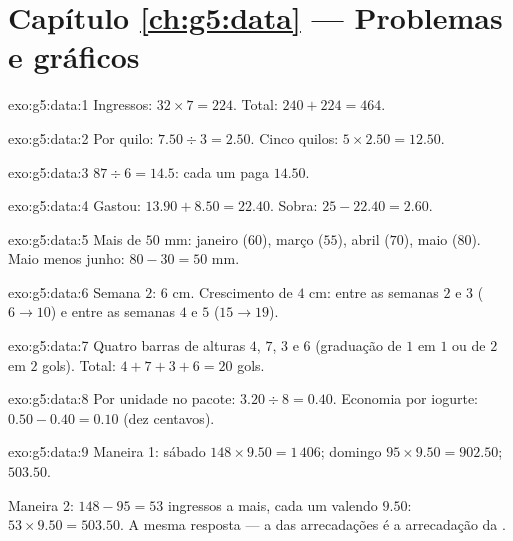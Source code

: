 \section*{Capítulo \ref{ch:g5:data} --- Problemas e gráficos}

\begin{solution}{exo:g5:data:1}
Ingressos: $32 \times 7 = 224$. Total: $240 + 224 = 464$.
\end{solution}

\begin{solution}{exo:g5:data:2}
Por quilo: $7.50 \div 3 = 2.50$. Cinco quilos:
$5 \times 2.50 = 12.50$.
\end{solution}

\begin{solution}{exo:g5:data:3}
$87 \div 6 = 14.5$: cada um paga $14.50$.
\end{solution}

\begin{solution}{exo:g5:data:4}
Gastou: $13.90 + 8.50 = 22.40$. Sobra: $25 - 22.40 = 2.60$.
\end{solution}

\begin{solution}{exo:g5:data:5}
Mais de $50$ mm: janeiro ($60$), março ($55$), abril ($70$), maio
($80$). Maio menos junho: $80 - 30 = 50$ mm.
\end{solution}

\begin{solution}{exo:g5:data:6}
Semana $2$: $6$ cm. Crescimento de $4$ cm: entre as semanas $2$ e $3$
($6 \to 10$) e entre as semanas $4$ e $5$ ($15 \to 19$).
\end{solution}

\begin{solution}{exo:g5:data:7}
Quatro barras de alturas $4$, $7$, $3$ e $6$ (graduação de $1$ em $1$
ou de $2$ em $2$ gols). Total: $4 + 7 + 3 + 6 = 20$ gols.
\end{solution}

\begin{solution}{exo:g5:data:8}
Por unidade no pacote: $3.20 \div 8 = 0.40$. Economia por iogurte:
$0.50 - 0.40 = 0.10$ (dez centavos).
\end{solution}

\begin{solution}{exo:g5:data:9}
Maneira 1: sábado $148 \times 9.50 = 1\,406$; domingo
$95 \times 9.50 = 902.50$;  $503.50$.

Maneira 2: $148 - 95 = 53$ ingressos a mais, cada um valendo $9.50$:
$53 \times 9.50 = 503.50$. A mesma resposta --- a  das
arrecadações é a arrecadação da .
\end{solution}


